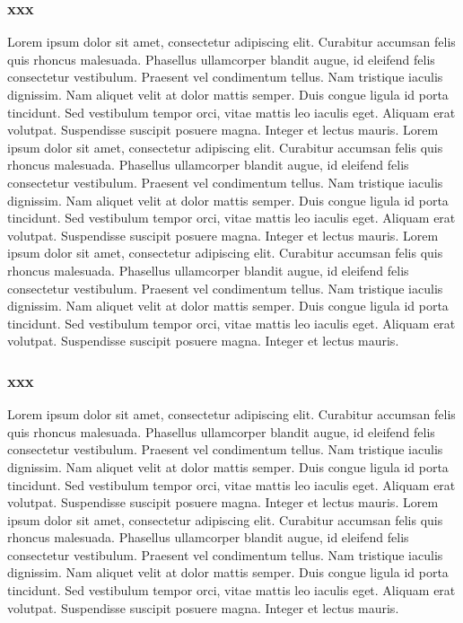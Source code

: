 \documentclass[12pt, a4paper]{book}
\newcommand\apparat[2]{\edtext{#1}{\Afootnote{#2}}}
\newcommand\apparatB[2]{\edtext{#1}{\Bfootnote{#2}}}
\begin{document}
\begin{pages}
\begin{Rightside}
\subsubsection{xxx}\skipnumbering
\pend
\pstart
\begin{ledgroup}
\skipnumbering
Lorem ipsum dolor sit amet, consectetur adipiscing elit. Curabitur accumsan felis quis rhoncus malesuada. Phasellus ullamcorper blandit augue, id eleifend felis consectetur vestibulum. Praesent vel condimentum tellus. Nam tristique iaculis dignissim. Nam aliquet velit at dolor mattis semper. Duis congue ligula id porta tincidunt. Sed vestibulum tempor orci, vitae mattis leo iaculis eget. Aliquam erat volutpat. Suspendisse suscipit posuere magna. Integer et lectus mauris. \apparat{aaa}{eeee}
Lorem ipsum dolor sit amet, consectetur adipiscing elit. Curabitur accumsan felis quis rhoncus malesuada. Phasellus ullamcorper blandit augue, id eleifend felis consectetur vestibulum. Praesent vel condimentum tellus. Nam tristique iaculis dignissim. Nam aliquet velit at dolor mattis semper. Duis congue ligula id porta tincidunt. Sed vestibulum tempor orci, vitae mattis leo iaculis eget. Aliquam erat volutpat. Suspendisse suscipit posuere magna. Integer et lectus mauris. \apparatB{aaa}{eeee}
Lorem ipsum dolor sit amet, consectetur adipiscing elit. Curabitur accumsan felis quis rhoncus malesuada. Phasellus ullamcorper blandit augue, id eleifend felis consectetur vestibulum. Praesent vel condimentum tellus. Nam tristique iaculis dignissim. Nam aliquet velit at dolor mattis semper. Duis congue ligula id porta tincidunt. Sed vestibulum tempor orci, vitae mattis leo iaculis eget. Aliquam erat volutpat. Suspendisse suscipit posuere magna. Integer et lectus mauris. \apparatB{aaa}{eeee}
\end{ledgroup}
\pend
\pstart
\subsubsection{xxx}
\pend
\pstart
\begin{ledgroup}
\skipnumbering
Lorem ipsum dolor sit amet, consectetur adipiscing elit. Curabitur accumsan felis quis rhoncus malesuada. Phasellus ullamcorper blandit augue, id eleifend felis consectetur vestibulum. Praesent vel condimentum tellus. Nam tristique iaculis dignissim. Nam aliquet velit at dolor mattis semper. Duis congue ligula id porta tincidunt. Sed vestibulum tempor orci, vitae mattis leo iaculis eget. Aliquam erat volutpat. Suspendisse suscipit posuere magna. Integer et lectus mauris. \apparat{aaa}{eeee}
Lorem ipsum dolor sit amet, consectetur adipiscing elit. Curabitur accumsan felis quis rhoncus malesuada. Phasellus ullamcorper blandit augue, id eleifend felis consectetur vestibulum. Praesent vel condimentum tellus. Nam tristique iaculis dignissim. Nam aliquet velit at dolor mattis semper. Duis congue ligula id porta tincidunt. Sed vestibulum tempor orci, vitae mattis leo iaculis eget. Aliquam erat volutpat. Suspendisse suscipit posuere magna. Integer et lectus mauris. \apparatB{aaa}{eeee}
\end{ledgroup}
\pend
\endnumbering
\end{Rightside}
\Pages
\end{pages}
\end{document}

